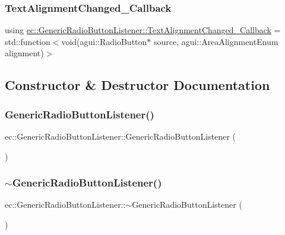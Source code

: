 \subsubsection{\texorpdfstring{Text\+Alignment\+Changed\+\_\+\+Callback}{TextAlignmentChanged\_Callback}}
{\footnotesize\ttfamily using \mbox{\hyperlink{classec_1_1_generic_radio_button_listener_a3e8ead6a08363f220625d2f856b9213d}{ec\+::\+Generic\+Radio\+Button\+Listener\+::\+Text\+Alignment\+Changed\+\_\+\+Callback}} =  std\+::function$<$void(agui\+::\+Radio\+Button$\ast$ source, agui\+::\+Area\+Alignment\+Enum alignment)$>$}



\subsection{Constructor \& Destructor Documentation}
\mbox{\label{classec_1_1_generic_radio_button_listener_a8774f775095744c1ed25d81dc1332395}} 
\subsubsection{\texorpdfstring{Generic\+Radio\+Button\+Listener()}{GenericRadioButtonListener()}}
{\footnotesize\ttfamily ec\+::\+Generic\+Radio\+Button\+Listener\+::\+Generic\+Radio\+Button\+Listener (\begin{DoxyParamCaption}{ }\end{DoxyParamCaption})\hspace{0.3cm}{\ttfamily [explicit]}}

\mbox{\label{classec_1_1_generic_radio_button_listener_aec9a1695248927929f3338e9e433514d}} 
\subsubsection{\texorpdfstring{$\sim$\+Generic\+Radio\+Button\+Listener()}{~GenericRadioButtonListener()}}
{\footnotesize\ttfamily ec\+::\+Generic\+Radio\+Button\+Listener\+::$\sim$\+Generic\+Radio\+Button\+Listener (\begin{DoxyParamCaption}{ }\end{DoxyParamCaption})\hspace{0.3cm}{\ttfamily [default]}}




